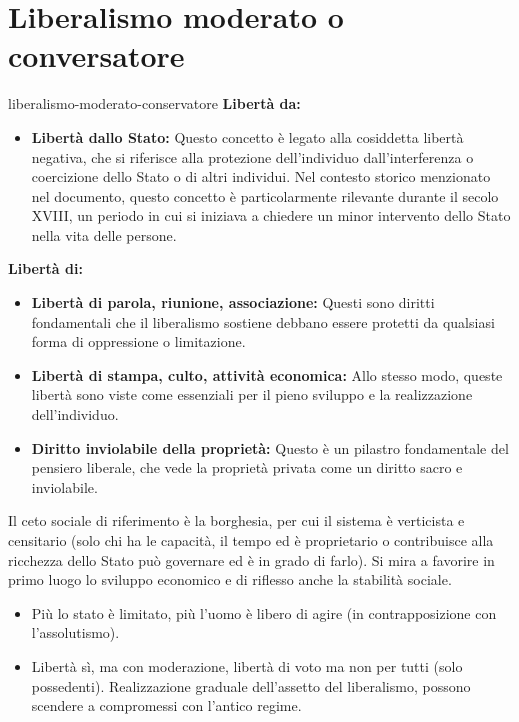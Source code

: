 \documentclass[preview]{standalone}
\begin{document}
\section{Liberalismo moderato o conversatore}

\begin{snippet}{liberalismo-moderato-conservatore}
    \textbf{Libertà da:}
    \begin{itemize}
        \item \textbf{Libertà dallo Stato:} Questo concetto è legato alla cosiddetta libertà negativa, che si riferisce alla protezione dell'individuo
            dall'interferenza o coercizione dello Stato o di altri individui.
            Nel contesto storico menzionato nel documento, questo concetto è particolarmente
            rilevante durante il secolo XVIII, un periodo in cui si iniziava
            a chiedere un minor intervento dello Stato nella vita delle persone.
    \end{itemize}

    \textbf{Libertà di:}
    \begin{itemize}
        \item \textbf{Libertà di parola, riunione, associazione:} Questi sono diritti fondamentali che il liberalismo sostiene debbano essere protetti da qualsiasi forma di oppressione o limitazione.
        \item \textbf{Libertà di stampa, culto, attività economica:} Allo stesso modo, queste libertà sono viste come essenziali per il pieno sviluppo e la realizzazione dell'individuo.
        \item \textbf{Diritto inviolabile della proprietà:} Questo è un pilastro fondamentale del pensiero liberale, che vede la proprietà privata come un diritto sacro e inviolabile.
    \end{itemize}

    Il ceto sociale di riferimento è la borghesia, per cui il sistema è verticista e censitario (solo chi
    ha le capacità, il tempo ed è proprietario o contribuisce alla ricchezza dello Stato può governare
    ed è in grado di farlo).
    Si mira a favorire in primo luogo lo sviluppo economico e di riflesso anche la stabilità sociale.

    \begin{itemize}
        \item Più lo stato è limitato, più l'uomo è libero di agire (in contrapposizione con l'assolutismo).
        \item Libertà sì, ma con moderazione, libertà di voto ma non per tutti (solo possedenti). Realizzazione graduale dell'assetto del liberalismo, possono scendere a compromessi con l'antico regime.
    \end{itemize}
\end{snippet}
\end{document}
